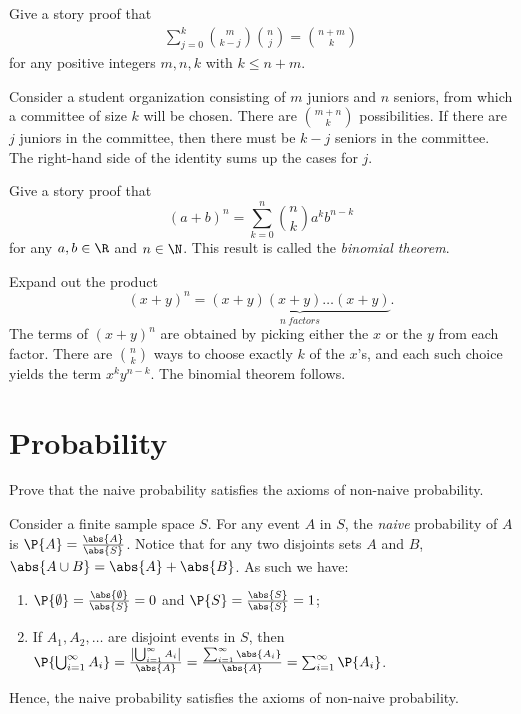 	\begin{exercise}\label{ex:chap01:12}
		Give a story proof that
		\begin{align*}
			\sum_{j = 0}^k \binom{m}{k - j} \binom{n}{j} = \binom{n + m}{k}
		\end{align*}
		for any positive integers $m, n, k$ with $k \leq n + m$.
		\begin{solution}
			Consider a student organization consisting of $m$ juniors and $n$ seniors, from which a committee of size $k$ will be chosen. There are $\binom{m+n}{k}$ possibilities. If there are $j$ juniors in the committee, then there must be $k - j$ seniors in the committee. The right-hand side of the identity sums up the cases for $j$.
		\end{solution}
	\end{exercise}

	\begin{exercise}
		Give a story proof that
		\begin{equation}
			(a + b)^n = \sum_{k=0}^n {n \choose k}a^k b^{n-k}
		\end{equation}
		for any $a,b \in \R$ and $n \in \N$. This result is called the \emph{binomial theorem}.
		\begin{solution}
			Expand out the product
			\begin{equation*}
				(x + y)^n = \underbrace{(x + y)(x + y) \ldots (x + y)}_{n \: factors}.
			\end{equation*}
			The terms of $(x + y)^n$ are obtained by picking either the $x$ or the $y$ from each factor. There are $\binom{n}{k}$ ways to choose exactly $k$ of the $x$'s, and each such choice yields the term $x^k y^{n - k}$. The binomial theorem follows.
		\end{solution}
	\end{exercise}

\section{Probability}
\label{sec:section-1.4}	 
	
	\begin{exercise}
		Prove that the naive probability satisfies the axioms of non-naive probability. 
		\begin{solution}
			Consider a finite sample space $S$. For any event $A$ in $S$, the \emph{naive} probability of $A$ is $\P{A} = \frac{\abs{A}}{\abs{S}}$. Notice that for any two disjoints sets $A$ and $B$, $\abs{A \cup B} = \abs{A} + \abs{B}$. As such we have:
			\begin{enumerate}
				\item $\P{\emptyset} = \frac{\abs{\emptyset}}{\abs{S}} = 0$ and $\P{S} = \frac{\abs{S}}{\abs{S}} = 1$;
				\item If $A_1, A_2, \hdots$ are disjoint events in $S$, then $\P{\bigcup_{i = 1}^{\infty} A_i} = \frac{\left|\bigcup_{i = 1}^{\infty} A_i\right|}{\abs{A}} = \frac{\sum_{i = 1}^{\infty} \abs{A_i}}{\abs{A}} = \sum_{i = 1}^{\infty} \P{A_i}$.
			\end{enumerate}
			Hence, the naive probability satisfies the axioms of non-naive probability. 
		\end{solution}
	\end{exercise}
	
